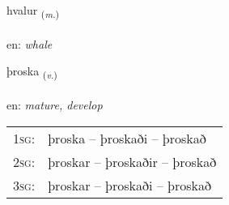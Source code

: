 \documentclass[frontgrid, backgrid]{flacards}\usepackage[]{graphicx}\usepackage[]{xcolor}
\begin{document}
\renewcommand{\flhead}{\vskip5pt \fboxsep=0pt {\small\bfseries\footnotesize Nafnorð | Noun}}
\renewcommand{\fcfoot}{\vskip5pt \fboxsep=0pt \hspace{2pt}{\small\bfseries\footnotesize 3K}}

\renewcommand{\blhead}{\vskip5pt {\small\bfseries\footnotesize Nafnorð | Noun }}
\renewcommand{\bcfoot}{\vskip5pt \hspace{2pt}{\small\bfseries\footnotesize 3K}}


{hvalur \small{\textsubscript{(\textit{m.})}} \\[1ex] %
\textphonetic{[kʰvaːlʏr]} \\
en: \emph{whale} \\  [2ex]
\renewcommand*{\arraystretch}{0.8}
}

\renewcommand{\flhead}{\vskip5pt \fboxsep=0pt {\small\bfseries\footnotesize Sagnorð | Verb}}
\renewcommand{\fcfoot}{\vskip5pt \fboxsep=0pt \hspace{2pt}{\small\bfseries\footnotesize 3K}}

\renewcommand{\blhead}{\vskip5pt {\small\bfseries\footnotesize Sagnorð | Verb }}
\renewcommand{\bcfoot}{\vskip5pt \hspace{2pt}{\small\bfseries\footnotesize 3K}}


{þroska \small{\textsubscript{(\textit{v.})}} \\[1ex] %
\textphonetic{[θrɔska]} \\
en: \emph{mature, develop} \\  [2ex]
\renewcommand*{\arraystretch}{0.8}
\begin{tabular}{p{1cm}l}
\textsc{1sg}: & þroska -- þroskaði -- þroskað \\ 
\textsc{2sg}: & þroskar -- þroskaðir -- þroskað \\ 
\textsc{3sg}: & þroskar -- þroskaði -- þroskað \\ 
\end{tabular}
}
\end{document}
